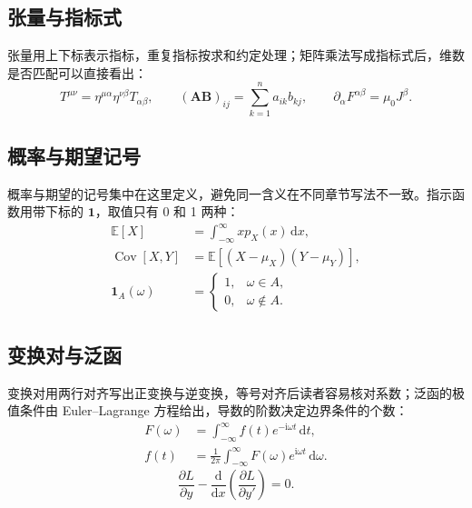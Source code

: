 \subsection{张量与指标式}

张量用上下标表示指标，重复指标按求和约定处理；矩阵乘法写成指标式后，维数是否匹配可以直接看出：
\begin{equation}
  T^{\mu\nu}=\eta^{\mu\alpha}\eta^{\nu\beta}T_{\alpha\beta},\qquad
  (\bm{A}\bm{B})_{ij}=\sum_{k=1}^{n}a_{ik}b_{kj},\qquad
  \partial_\alpha F^{\alpha\beta}=\mu_0J^\beta.
  \label{eq:tensor-index}
\end{equation}

\subsection{概率与期望记号}

概率与期望的记号集中在这里定义，避免同一含义在不同章节写法不一致。指示函数用带下标的 $\mathbf{1}$，取值只有 0 和 1 两种：
\begin{equation}
  \begin{aligned}
    \mathbb{E}[X]&=\int_{-\infty}^{\infty}xp_X(x)\,\mathrm{d}x,\\
    \operatorname{Cov}[X,Y]&=\mathbb{E}[(X-\mu_X)(Y-\mu_Y)],\\
    \mathbf{1}_{A}(\omega)&=
    \begin{cases}
      1,&\omega\in A,\\
      0,&\omega\notin A.
    \end{cases}
  \end{aligned}
  \label{eq:probability-notation}
\end{equation}

\subsection{变换对与泛函}

变换对用两行对齐写出正变换与逆变换，等号对齐后读者容易核对系数；泛函的极值条件由 Euler--Lagrange 方程给出，导数的阶数决定边界条件的个数：
\begin{equation}
  \begin{aligned}
    F(\omega)&=\int_{-\infty}^{\infty}f(t)e^{-\mathrm{i}\omega t}\,\mathrm{d}t,\\
    f(t)&=\frac{1}{2\pi}\int_{-\infty}^{\infty}
      F(\omega)e^{\mathrm{i}\omega t}\,\mathrm{d}\omega.
  \end{aligned}
  \label{eq:transform-pair}
\end{equation}
\begin{equation}
  \frac{\partial L}{\partial y}
  -\frac{\mathrm{d}}{\mathrm{d}x}
  \left(\frac{\partial L}{\partial y'}\right)=0.
  \label{eq:euler-lagrange}
\end{equation}

